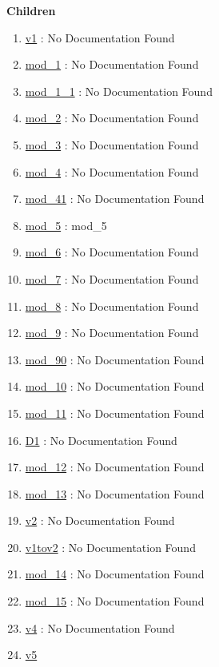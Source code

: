 \textbf{Children}
\begin{enumerate}
\item \hyperlink{ecldoc:types.v1}{v1}
: No Documentation Found
\item \hyperlink{ecldoc:types.mod_1}{mod\_1}
: No Documentation Found
\item \hyperlink{ecldoc:types.mod_1_1}{mod\_1\_1}
: No Documentation Found
\item \hyperlink{ecldoc:types.mod_2}{mod\_2}
: No Documentation Found
\item \hyperlink{ecldoc:ecldoc-mod_3}{mod\_3}
: No Documentation Found
\item \hyperlink{ecldoc:ecldoc-mod_4}{mod\_4}
: No Documentation Found
\item \hyperlink{ecldoc:types.mod_41}{mod\_41}
: No Documentation Found
\item \hyperlink{ecldoc:types.mod_5}{mod\_5}
: mod\_5
\item \hyperlink{ecldoc:types.mod_6}{mod\_6}
: No Documentation Found
\item \hyperlink{ecldoc:types.mod_7}{mod\_7}
: No Documentation Found
\item \hyperlink{ecldoc:types.mod_8}{mod\_8}
: No Documentation Found
\item \hyperlink{ecldoc:types.mod_9}{mod\_9}
: No Documentation Found
\item \hyperlink{ecldoc:types.mod_90}{mod\_90}
: No Documentation Found
\item \hyperlink{ecldoc:types.mod_10}{mod\_10}
: No Documentation Found
\item \hyperlink{ecldoc:types.mod_11}{mod\_11}
: No Documentation Found
\item \hyperlink{ecldoc:types.d1}{D1}
: No Documentation Found
\item \hyperlink{ecldoc:types.mod_12}{mod\_12}
: No Documentation Found
\item \hyperlink{ecldoc:types.mod_13}{mod\_13}
: No Documentation Found
\item \hyperlink{ecldoc:types.v2}{v2}
: No Documentation Found
\item \hyperlink{ecldoc:types.v1tov2}{v1tov2}
: No Documentation Found
\item \hyperlink{ecldoc:types.mod_14}{mod\_14}
: No Documentation Found
\item \hyperlink{ecldoc:types.mod_15}{mod\_15}
: No Documentation Found
\item \hyperlink{ecldoc:types.v4}{v4}
: No Documentation Found
\item \hyperlink{ecldoc:types.v5}{v5}

\end{enumerate}
